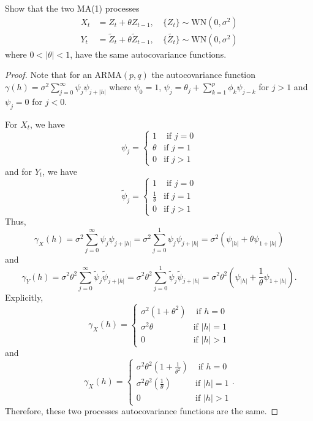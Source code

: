\documentclass[12pt]{article}
\theoremstyle{definition}
\newenvironment{custompbm}[1]
  {\renewcommand\theproblem{#1}\problem}
  {\endproblem}
\begin{document}
\begin{custompbm}{3.6}
  Show that the two MA(1) processes
  \begin{align*}
    X_t &= Z_t + \theta Z_{t-1}, \quad \{Z_t\} \sim \text{WN}(0, \sigma ^ 2)\\
    Y_t &= \widetilde{Z}_t + \theta \widetilde{Z}_{t-1}, \quad \{\widetilde{Z_t}\} \sim \text{WN}(0, \sigma ^ 2)
  \end{align*}
  where $0 < |\theta| < 1$, have the same autocovariance functions.
\end{custompbm}

\begin{proof}
  Note that for an ARMA$(p,q)$ the autocovariance function $\gamma(h) = \sigma^2 \sum_{j=0}^\infty \psi_j \psi_{j+|h|}$
  where $\psi_0 = 1$, $\psi_j = \theta_j + \sum_{k=1}^p \phi_k \psi_{j-k}$ for $j >1$ and $\psi_j = 0$ for $j<0$.

  For $X_t$, we have
  \[
    \psi_j =
    \begin{cases}
      1 & \text{ if $j = 0$}\\
      \theta & \text{if $j = 1$}\\
      0 & \text{if $j > 1$}
    \end{cases}
  \]
  and for $Y_t$, we have
  \[
    \widetilde{\psi}_j =
    \begin{cases}
      1 & \text{ if $j = 0$}\\
      \frac{1}{\theta} & \text{if $j = 1$}\\
      0 & \text{if $j > 1$}
    \end{cases}
  \]
  Thus, $$\gamma_X(h) = \sigma^2 \sum_{j=0}^\infty \psi_{j} \psi_{j + |h|} = \sigma^2 \sum_{j=0}^1 \psi_{j} \psi_{j + |h|} = \sigma^2(\psi_{|h|} + \theta\psi_{1+|h|})$$
  and $$\gamma_Y(h) = \sigma^2\theta^2 \sum_{j=0}^\infty \widetilde{\psi}_{j} \widetilde{\psi}_{j + |h|} = \sigma^2\theta^2 \sum_{j=0}^1 \widetilde{\psi}_{j} \widetilde{\psi}_{j + |h|}= \sigma^2\theta^2\left(\psi_{|h|} + \frac{1}{\theta}\psi_{1+|h|}\right ).$$
  Explicitly,
  \[
    \gamma_X(h) =
    \begin{cases}
      \sigma^2(1+\theta^2) & \text{ if $h = 0$}\\
      \sigma^2 \theta & \text{if $|h| = 1$}\\
      0 & \text{if $|h| > 1$}
    \end{cases}
  \]
  and
  \[
    \gamma_X(h) =
    \begin{cases}
      \sigma^2\theta^2\left(1+\frac{1}{\theta^2}\right) & \text{ if $h = 0$}\\
      \sigma^2 \theta^2 \left(\frac{1}{\theta}\right) & \text{if $|h| = 1$}\\
      0 & \text{if $|h| > 1$}
    \end{cases}.
  \]
  Therefore, these two processes autocovariance functions are the same.
\end{proof}
\end{document}
